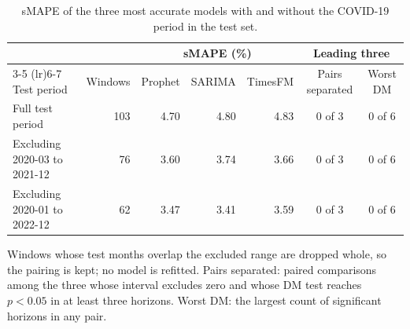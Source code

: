 \begin{table}[htbp]
\centering
\small
\setlength{\tabcolsep}{5pt}
\caption{sMAPE of the three most accurate models with and without the COVID-19 period in the test set.}
\label{tab:covid}
\begin{tabular}{lrrrrcc}
\toprule
& & \multicolumn{3}{c}{sMAPE (\%)} & \multicolumn{2}{c}{Leading three} \\
\cmidrule(lr){3-5} \cmidrule(lr){6-7}
Test period & Windows & Prophet & SARIMA & TimesFM & Pairs separated & Worst DM \\
\midrule
Full test period & 103 & 4.70 & 4.80 & 4.83 & 0 of 3 & 0 of 6 \\
Excluding 2020-03 to 2021-12 & 76 & 3.60 & 3.74 & 3.66 & 0 of 3 & 0 of 6 \\
Excluding 2020-01 to 2022-12 & 62 & 3.47 & 3.41 & 3.59 & 0 of 3 & 0 of 6 \\
\bottomrule
\end{tabular}

\vspace{0.5em}
\begin{minipage}{\textwidth}
\footnotesize
Windows whose test months overlap the excluded range are dropped whole, so the pairing is kept; no model is refitted. Pairs separated: paired comparisons among the three whose interval excludes zero and whose DM test reaches $p<0.05$ in at least three horizons. Worst DM: the largest count of significant horizons in any pair.
\end{minipage}
\end{table}
